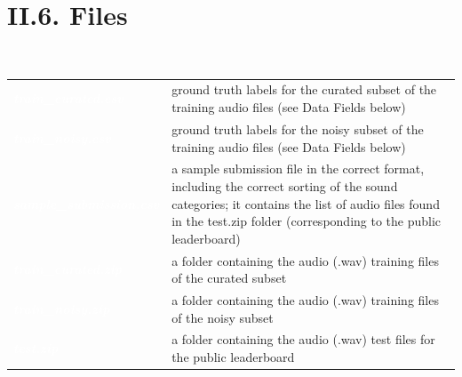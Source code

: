 \documentclass[11pt, a4papper]{report}
\theoremstyle{plain}
\theoremstyle{definition}
\theoremstyle{definition}
\theoremstyle{proposition}
\begin{document}
\section*{II.6. Files}
\

\begin{center}
\begin{footnotesize}
\begin{tabular}{ | M{4.6cm} | m{10cm} | } 
\hline
{} \\
\hline
{}
\textit{\textbf{\textcolor{white}{train\_curated.csv }}}&   {ground truth labels for the curated subset of the training audio files (see Data Fields below)} \\
\hline
{}
\textit{\textbf{\textcolor{white}{train\_noisy.csv}}} &   { ground truth labels for the noisy subset of the training audio files (see Data Fields below)} \\
\hline
{}
\textit{\textbf{\textcolor{white}{sample\_submission.csv}}}&   { a sample submission file in the correct format, including the correct sorting of the sound categories; it contains the list of audio files found in the test.zip folder (corresponding to the public leaderboard)} \\
\hline
{}
\textit{\textbf{\textcolor{white}{train\_curated.zip }}} &   { a folder containing the audio (.wav) training files of the curated subset}\\
\hline
{}
\textit{\textbf{\textcolor{white}{train\_noisy.zip }}} &   { a folder containing the audio (.wav) training files of the noisy subset}\\
\hline
{}
\textit{\textbf{\textcolor{white}{test.zip}}} &   {a folder containing the audio (.wav) test files for the public leaderboard}\\
\hline
\end{tabular}
\end{footnotesize}
\end{center}
\end{document}

